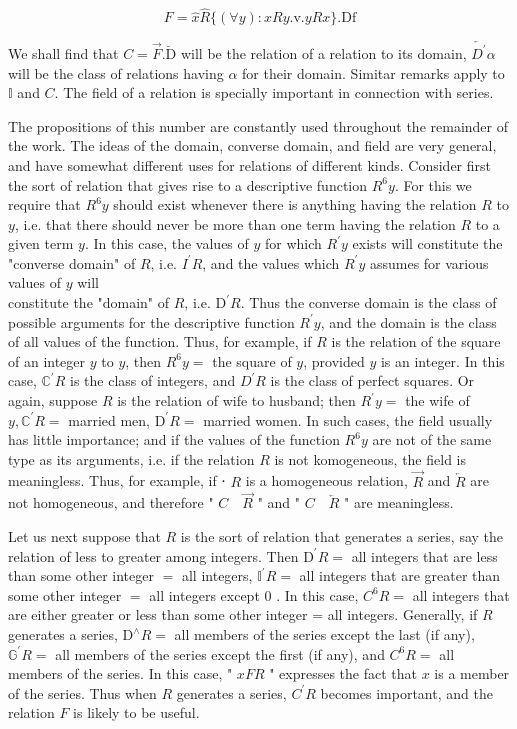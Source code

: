 \documentclass[10pt]{article}
\begin{document}
$$
F=\hat{x} \hat{R}\{(\forall y): x R y . \mathrm{v} . y R x\} . \mathrm{Df}
$$

We shall find that $C=\vec{F} . \breve{\mathrm{D}}$ will be the relation of a relation to its domain, $\overleftarrow{D^{\prime}} \alpha$ will be the class of relations having $\alpha$ for their domain. Simitar remarks apply to $\mathbb{I}$ and $C$. The field of a relation is specially important in connection with series.

The propositions of this number are constantly used throughout the remainder of the work. The ideas of the domain, converse domain, and field are very general, and have somewhat different uses for relations of different kinds. Consider first the sort of relation that gives rise to a descriptive function $R^{6} y$. For this we require that $R^{6} y$ should exist whenever there is anything having the relation $R$ to $y$, i.e. that there should never be more than one term having the relation $R$ to a given term $y$. In this case, the values of $y$ for which $R^{\prime} y$ exists will constitute the "converse domain" of $R$, i.e. $I^{\prime} R$, and the values which $R^{\prime} y$ assumes for various values of $y$ will\\
constitute the "domain" of $R$, i.e. $\mathrm{D}^{\prime} R$. Thus the converse domain is the class of possible arguments for the descriptive function $R^{\prime} y$, and the domain is the class of all values of the function. Thus, for example, if $R$ is the relation of the square of an integer $y$ to $y$, then $R^{6} y=$ the square of $y$, provided $y$ is an integer. In this case, $\mathbb{C}^{\prime} R$ is the class of integers, and $D^{\prime} R$ is the class of perfect squares. Or again, suppose $R$ is the relation of wife to husband; then $R^{\prime} y=$ the wife of $y, \mathbb{C}^{\prime} R=$ married men, $\mathrm{D}^{\prime} R=$ married women. In such cases, the field usually has little importance; and if the values of the function $R^{6} y$ are not of the same type as its arguments, i.e. if the relation $R$ is not komogeneous, the field is meaningless. Thus, for example, if ⋅ $R$ is a homogeneous relation, $\vec{R}$ and $\overleftarrow{R}$ are not homogeneous, and therefore " $C \quad \vec{R}$ " and " $C \quad \overleftarrow{R}$ " are meaningless.

Let us next suppose that $R$ is the sort of relation that generates a series, say the relation of less to greater among integers. Then $\mathrm{D}^{\prime} R=$ all integers that are less than some other integer $=$ all integers, $\mathbb{I}^{\prime} R=$ all integers that are greater than some other integer $=$ all integers except 0 . In this case, $C^{6} R=$ all integers that are either greater or less than some other integer = all integers. Generally, if $R$ generates a series, $\mathrm{D}^{\wedge} R=$ all members of the series except the last (if any), $\mathbb{G}^{\prime} R=$ all members of the series except the first (if any), and $C^{6} R=$ all members of the series. In this case, " $x F R$ " expresses the fact that $x$ is a member of the series. Thus when $R$ generates a series, $C^{\prime} R$ becomes important, and the relation $F$ is likely to be useful.
\end{document}
